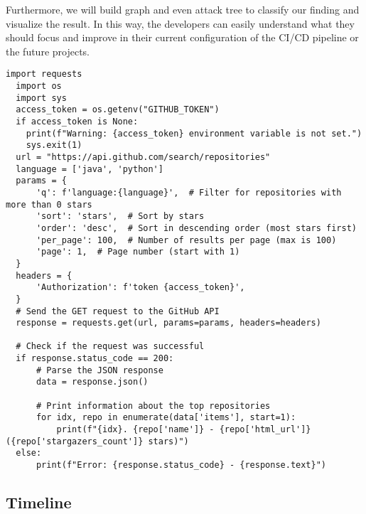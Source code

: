 Furthermore, we will build graph and even attack tree to classify our finding and visualize 
the result. In this way, the developers can easily understand what they should focus 
and improve in their current configuration of the CI/CD pipeline or the future projects.

\begin{lstlisting}[style=mystyle, caption={Fetch Top 100 Java and Python Repositories}, label=pythoncode]
  import requests
  import os
  import sys
  access_token = os.getenv("GITHUB_TOKEN")
  if access_token is None:
    print(f"Warning: {access_token} environment variable is not set.")
    sys.exit(1)    
  url = "https://api.github.com/search/repositories"  
  language = ['java', 'python']
  params = {
      'q': f'language:{language}',  # Filter for repositories with more than 0 stars
      'sort': 'stars',  # Sort by stars
      'order': 'desc',  # Sort in descending order (most stars first)
      'per_page': 100,  # Number of results per page (max is 100)
      'page': 1,  # Page number (start with 1)
  }
  headers = {
      'Authorization': f'token {access_token}',
  }
  # Send the GET request to the GitHub API
  response = requests.get(url, params=params, headers=headers)

  # Check if the request was successful
  if response.status_code == 200:
      # Parse the JSON response
      data = response.json()

      # Print information about the top repositories
      for idx, repo in enumerate(data['items'], start=1):
          print(f"{idx}. {repo['name']} - {repo['html_url']} ({repo['stargazers_count']} stars)")
  else:
      print(f"Error: {response.status_code} - {response.text}")
\end{lstlisting}

\subsection{Timeline}

